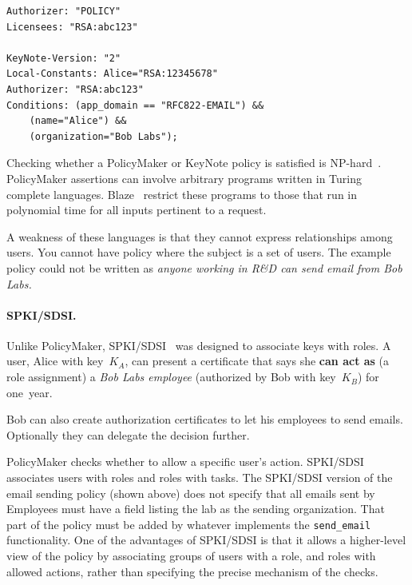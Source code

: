 \documentclass[thesis.tex]{subfiles}
\begin{document}
\noindent\begin{minipage}{\textwidth}
\begin{lstlisting}
Authorizer: "POLICY"
Licensees: "RSA:abc123"

KeyNote-Version: "2"
Local-Constants: Alice="RSA:12345678" 
Authorizer: "RSA:abc123"
Conditions: (app_domain == "RFC822-EMAIL") &&
    (name="Alice") &&
    (organization="Bob Labs");
\end{lstlisting}
\end{minipage}

Checking whether a PolicyMaker or KeyNote policy is satisfied is
NP-hard~\cite{blaze_compliance_1998}. PolicyMaker assertions can involve
arbitrary programs written in Turing complete languages. Blaze~\etal{} restrict
these programs to those that run in polynomial time for all inputs pertinent to
a request.

A weakness of these languages is that they cannot express relationships among
users. You cannot have policy where the subject is a set of users. The example
policy could not be written as \emph{anyone working in R\&D can send email from
Bob Labs.}


\paragraph*{SPKI/SDSI.}
Unlike PolicyMaker, SPKI/SDSI~\cite{ellison_spki_1999} was
designed to associate keys with roles.  A user, Alice with key~$K_A$,
can present a certificate that says she \textbf{can act as} (a role assignment) a \emph{Bob Labs
employee} (authorized by Bob with key~$K_B$) for one~year.

\noindent{}

Bob can also create authorization certificates to let his employees
to send emails. Optionally they can delegate the decision further.

\noindent{}

PolicyMaker checks whether to allow a specific user's action. SPKI/SDSI associates users with roles and
roles with tasks. The SPKI/SDSI version of the email sending policy (shown above) does not
specify that all emails sent by Employees must have a field listing the lab as
the sending organization. That part of the policy must be added by
whatever implements the \texttt{send\_email} functionality. One of the
advantages of SPKI/SDSI is that it allows a higher-level view of the policy by
associating groups of users with a role, and roles with allowed actions, rather than specifying the precise mechanism of the checks.
\end{document}
